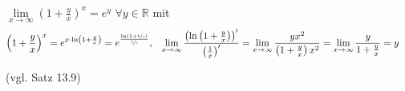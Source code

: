 \begin{example}
	$\lim\limits_{x\to\infty} \left( 1 + \frac{y}{x}\right) ^x = e^y$ $\forall y\in\mathbb{R}$ mit \begin{align*}
		\left( 1 + \frac{y}{x}\right)^x &= e^{x\cdot \ln \left( 1 + \frac{y}{x}\right)} = e^{\frac{\ln \left( 1 + \sfrac{y}{x}\right)}{\sfrac{1}{x}}}, &
		\lim\limits_{x\to\infty} \dfrac{\left(\ln \left( 1 + \frac{y}{x}\right) \right)'}{\left(\frac{1}{x}\right)'} &= \lim\limits_{x\to\infty} \dfrac{yx^2}{\left(1 + \frac{y}{x}\right) x^2} = \lim\limits_{x\to\infty} \dfrac{y}{1 + \frac{y}{x}} = y
	\end{align*}
	
	(vgl. Satz 13.9)
\end{example}